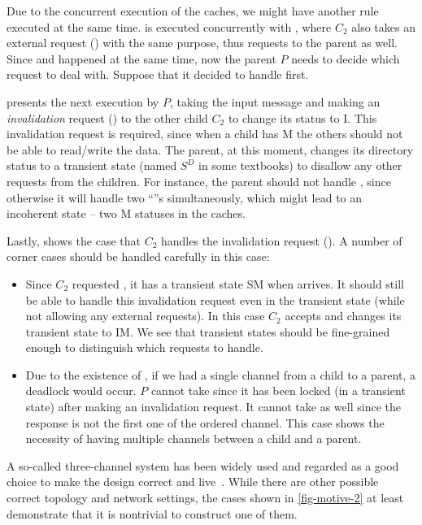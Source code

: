 \documentclass[sigplan,10pt,review,anonymous,screen]{acmart}\settopmatter{printfolios=true,printccs=false,printacmref=false}
\begin{document}
Due to the concurrent execution of the caches, we might have another rule executed at the same time.
 is executed concurrently with , where $C_2$ also takes an external request () with the same purpose, thus requests  to the parent as well.
Since  and  happened at the same time, now the parent $P$ needs to decide which request to deal with.
Suppose that it decided to handle  first.

 presents the next execution by $P$, taking the input message  and making an \emph{invalidation} request () to the other child $C_2$ to change its status to I.
This invalidation request is required, since when a child has M the others should not be able to read/write the data.
The parent, at this moment, changes its directory status to a transient state (named $S^D$ in some textbooks) to disallow any other requests from the children.
For instance, the parent should not handle , since otherwise it will handle two ``''s simultaneously, which might lead to an incoherent state -- two M statuses in the caches.

Lastly,  shows the case that $C_2$ handles the invalidation request ().
A number of corner cases should be handled carefully in this case:
\begin{itemize}[leftmargin=*]
\item Since $C_2$ requested , it has a transient state SM when  arrives. It should still be able to handle this invalidation request even in the transient state (while not allowing any external requests). In this case $C_2$ accepts  and changes its transient state to IM. We see that transient states should be fine-grained enough to distinguish which requests to handle.
\item Due to the existence of , if we had a single channel from a child to a parent, a deadlock would occur. $P$ cannot take  since it has been locked (in a transient state) after making an invalidation request. It cannot take  as well since the response is not the first one of the ordered channel. This case shows the necessity of having multiple channels between a child and a parent.
\end{itemize}

A so-called three-channel system has been widely used and regarded as a good choice to make the design correct and live~\cite{Murali:2015,thesis:Murali:2016}.
While there are other possible correct topology and network settings, the cases shown in \autoref{fig-motive-2} at least demonstrate that it is nontrivial to construct one of them.
\end{document}
